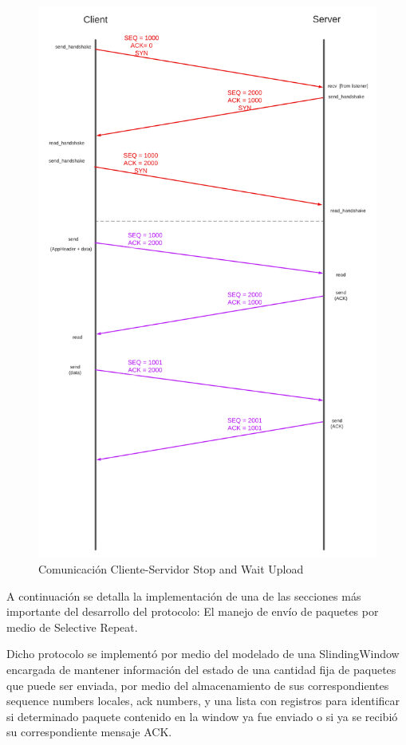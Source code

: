 \documentclass[11pt,a4paper]{article}
\begin{document}
\begin{figure}[H]
    \centering
    \begin{center}
    \includegraphics[width=13cm]
    {images/implementacion/comunicacion_general_SAW_upload.png}
    \end{center}
    \caption{Comunicación Cliente-Servidor Stop and Wait Upload}
\end{figure}

\newpage

A continuación se detalla la implementación de una de las secciones más importante del desarrollo del protocolo: El manejo de envío de paquetes por medio de Selective Repeat.

Dicho protocolo se implementó por medio del modelado de una SlindingWindow encargada de mantener información del estado de una cantidad fija de paquetes que puede ser enviada, por medio del almacenamiento de sus correspondientes sequence numbers locales, ack numbers, y una lista con registros para identificar si determinado paquete contenido en la window ya fue enviado o si ya se recibió su correspondiente mensaje ACK. 
\end{document}
